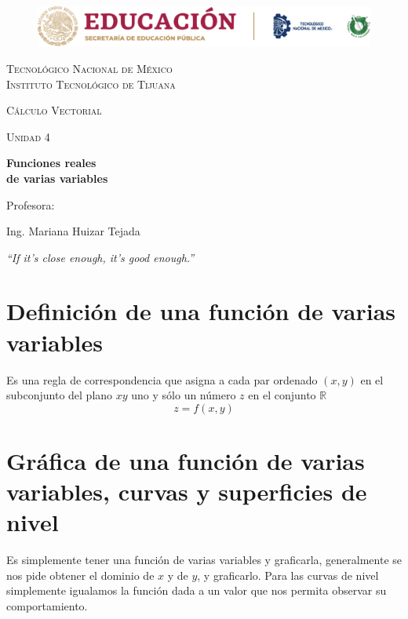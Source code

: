 \documentclass[letterpaper, 12pt]{article}
\begin{document}
    
    \begin{titlepage}
        \begin{figure}[ht]
            \centering
            \includegraphics[width=15cm]{logosITT.png}
        \end{figure}
        \centering
        {\scshape\LARGE Tecnológico Nacional de México\\Instituto Tecnológico de Tijuana\par}
        \vspace{1cm}
        {\scshape\Large Cálculo Vectorial\par}
        \vspace{1cm}
        {\scshape\Large Unidad 4\par}
        \vspace{1.5cm}
        {\huge\bfseries Funciones reales \\de varias variables\par}
        \vfill
        Profesora: \par
        Ing. Mariana Huizar Tejada
        
        \vfill

        {\large \emph{``If it's close enough, it's good enough.''}}


    \end{titlepage}

    \newpage
        \pagestyle{empty}
        \tableofcontents

    \newpage
        \pagestyle{fancy}
        \setcounter{page}{1}
        \section{Definición de una función de varias variables}
        \justify
        Es una regla de correspondencia que asigna a cada par ordenado \((x,y)\) en el subconjunto del plano \(xy\) uno y sólo un número \(z\) en el conjunto \(\mathbb{R}\)
        \[z=f(x,y)\]
        \section{Gráfica de una función de varias variables, curvas y superficies de nivel}
        \justify
        Es simplemente tener una función de varias variables y graficarla, generalmente se nos pide obtener el dominio de \(x\) y de \(y\), y graficarlo. Para las curvas de nivel simplemente igualamos
        la función dada a un valor que nos permita observar su comportamiento.
\end{document}
